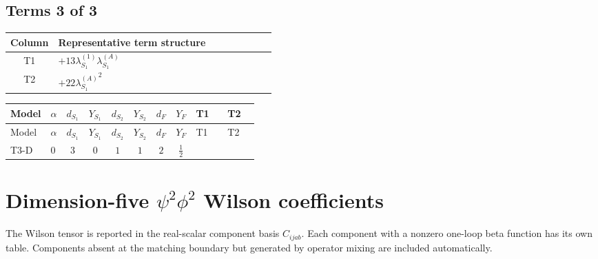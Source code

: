 \documentclass[8pt]{article}
\begin{document}
\begin{landscape}
\subsection*{Terms 3 of 3}
\begin{center}
\begin{tabular}{@{}c >{\raggedright\arraybackslash}p{0.82\linewidth}@{}}
\toprule
Column & Representative term structure \\
\midrule
T1 & \(\displaystyle +13 {\lambda_{S_1}^{(1)}} {\lambda_{S_1}^{(A)}}\) \\
\midrule
T2 & \(\displaystyle +22 {\lambda_{S_1}^{(A)}}^2\) \\
\midrule
\bottomrule
\end{tabular}
\end{center}
\smallskip
\tiny
\begin{longtable}{@{}llcccccc >{\raggedright\arraybackslash}p{0.21\linewidth} >{\raggedright\arraybackslash}p{0.21\linewidth}@{}}
\toprule
Model & $\alpha$ & $d_{S_1}$ & $Y_{S_1}$ & $d_{S_2}$ & $Y_{S_2}$ & $d_F$ & $Y_F$ & T1 & T2 \\
\midrule
\endfirsthead
\toprule
Model & $\alpha$ & $d_{S_1}$ & $Y_{S_1}$ & $d_{S_2}$ & $Y_{S_2}$ & $d_F$ & $Y_F$ & T1 & T2 \\
\midrule
\endhead
T3-D & $0$ & $3$ & $0$ & $1$ & $1$ & $2$ & $\frac{1}{2}$ & \scriptsize\adjustbox{max width=\linewidth}{$\begin{gathered} +13 {\lambda_{S_1}^{(1)}} {\lambda_{S_1}^{(A)}}\end{gathered}$} & \scriptsize\adjustbox{max width=\linewidth}{$\begin{gathered} +22 {\lambda_{S_1}^{(A)}}^2\end{gathered}$} \\
\midrule
\bottomrule
\end{longtable}
\clearpage
\section*{Dimension-five $\psi^2\phi^2$ Wilson coefficients}
The Wilson tensor is reported in the real-scalar component basis $C_{ijab}$. Each component with a nonzero one-loop beta function has its own table. Components absent at the matching boundary but generated by operator mixing are included automatically.

\end{landscape}
\end{document}
